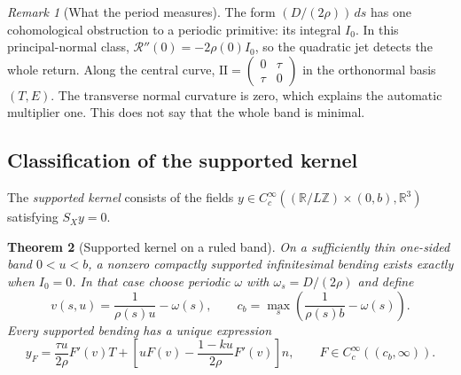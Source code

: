 \documentclass[11pt]{amsart}
\newtheorem{theorem}{Theorem}[section]
\theoremstyle{definition}
\theoremstyle{remark}
\newtheorem{remark}[theorem]{Remark}
\newcommand{\R}{\mathbb R}\newcommand{\Sph}{\mathbb S}
\newcommand{\II}{\mathrm{II}}\newcommand{\Gmap}{\mathcal G}
\numberwithin{equation}{section}
\begin{document}
\begin{remark}[What the period measures]\label{rem:period-holonomy}
The form $(D/(2\rho))\,ds$ has one cohomological obstruction to a
periodic primitive: its integral $I_0$. In this principal-normal class,
$\mathcal R''(0)=-2\rho(0)I_0$, so the quadratic jet detects the whole
return. Along the central curve,
$\II=\left(\begin{smallmatrix}0&\tau\\\tau&0\end{smallmatrix}\right)$
in the orthonormal basis $(T,E)$. The transverse normal curvature is zero,
which explains the automatic multiplier one. This does not say that the
whole band is minimal.
\end{remark}

\subsection{Classification of the supported kernel}
The \emph{supported kernel} consists of the fields
$y\in C_c^\infty((\R/L\mathbb Z)\times(0,b),\R^3)$ satisfying $S_Xy=0$.
\begin{theorem}[Supported kernel on a ruled band]\label{thm:ruled}
On a sufficiently thin one-sided band $0<u<b$, a nonzero compactly
supported infinitesimal bending exists exactly when $I_0=0$. In that
case choose periodic $\omega$ with $\omega_s=D/(2\rho)$ and define
\[
 v(s,u)=\frac1{\rho(s)u}-\omega(s),\qquad
 c_b=\max_s\left(\frac1{\rho(s)b}-\omega(s)\right).
\]
Every supported bending has a unique expression
\begin{equation}\label{eq:yF}
 y_F=\frac{\tau u}{2\rho}F'(v)T+
 \left[uF(v)-\frac{1-ku}{2\rho}F'(v)\right]n,
 \qquad F\in C_c^\infty((c_b,\infty)).
\end{equation}
\end{theorem}
\end{document}

